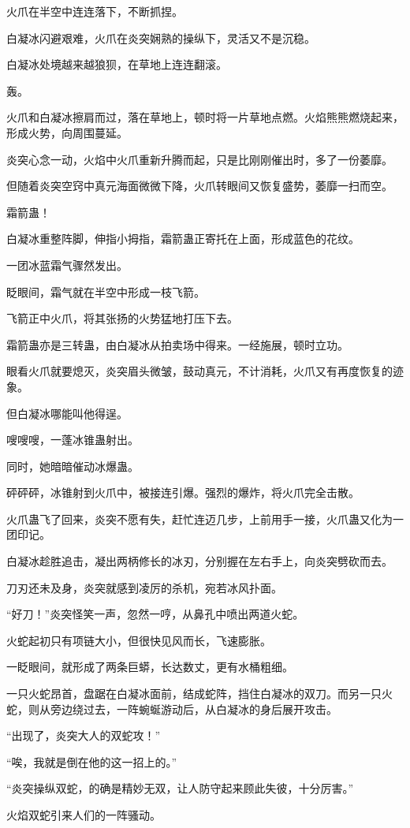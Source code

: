 \begin{this_body}
火爪在半空中连连落下，不断抓捏。

白凝冰闪避艰难，火爪在炎突娴熟的操纵下，灵活又不是沉稳。

白凝冰处境越来越狼狈，在草地上连连翻滚。

轰。

火爪和白凝冰擦肩而过，落在草地上，顿时将一片草地点燃。火焰熊熊燃烧起来，形成火势，向周围蔓延。

炎突心念一动，火焰中火爪重新升腾而起，只是比刚刚催出时，多了一份萎靡。

但随着炎突空窍中真元海面微微下降，火爪转眼间又恢复盛势，萎靡一扫而空。

霜箭蛊！

白凝冰重整阵脚，伸指小拇指，霜箭蛊正寄托在上面，形成蓝色的花纹。

一团冰蓝霜气骤然发出。

眨眼间，霜气就在半空中形成一枝飞箭。

飞箭正中火爪，将其张扬的火势猛地打压下去。

霜箭蛊亦是三转蛊，由白凝冰从拍卖场中得来。一经施展，顿时立功。

眼看火爪就要熄灭，炎突眉头微皱，鼓动真元，不计消耗，火爪又有再度恢复的迹象。

但白凝冰哪能叫他得逞。

嗖嗖嗖，一蓬冰锥蛊射出。

同时，她暗暗催动冰爆蛊。

砰砰砰，冰锥射到火爪中，被接连引爆。强烈的爆炸，将火爪完全击散。

火爪蛊飞了回来，炎突不愿有失，赶忙连迈几步，上前用手一接，火爪蛊又化为一团印记。

白凝冰趁胜追击，凝出两柄修长的冰刃，分别握在左右手上，向炎突劈砍而去。

刀刃还未及身，炎突就感到凌厉的杀机，宛若冰风扑面。

“好刀！”炎突怪笑一声，忽然一哼，从鼻孔中喷出两道火蛇。

火蛇起初只有项链大小，但很快见风而长，飞速膨胀。

一眨眼间，就形成了两条巨蟒，长达数丈，更有水桶粗细。

一只火蛇昂首，盘踞在白凝冰面前，结成蛇阵，挡住白凝冰的双刀。而另一只火蛇，则从旁边绕过去，一阵蜿蜒游动后，从白凝冰的身后展开攻击。

“出现了，炎突大人的双蛇攻！”

“唉，我就是倒在他的这一招上的。”

“炎突操纵双蛇，的确是精妙无双，让人防守起来顾此失彼，十分厉害。”

火焰双蛇引来人们的一阵骚动。


\end{this_body}
